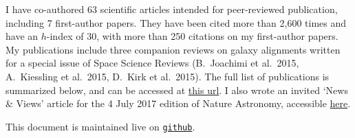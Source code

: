 I have co-authored 63 scientific articles intended for peer-reviewed publication,
including 7 first-author papers. They have been cited more than 2,600 times and
have an $h$-index of 30, with more than 250 citations on my first-author papers.
My publications include three companion reviews on galaxy alignments written for a
special issue of Space Science Reviews (B.\ Joachimi et al.\ 2015, A.\ Kiessling
et al.\ 2015, D.\ Kirk et al.\ 2015). The full list of publications is summarized
below, and can be accessed at \href{https://goo.gl/LAu9G4}{this url}. I also wrote
an invited `News \& Views' article for the 4 July 2017 edition of Nature
Astronomy, accessible
\href{https://www.nature.com/articles/s41550-017-0181}{here}.

This document is maintained live on
\href{https://github.com/cristobal-sifon/cv/blob/master/Sifon_publications.pdf}{\texttt{github}}.

